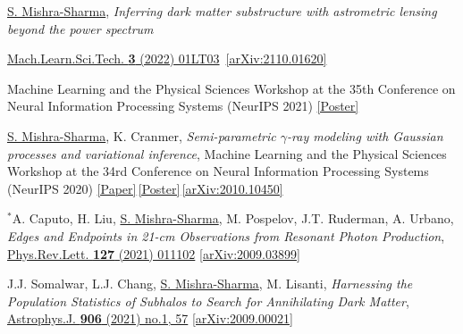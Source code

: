 \documentclass[letterpaper,11pt]{article}
\newenvironment{packed_itemize}{
\begin{itemize}[label=\raisebox{0.25ex}{\tiny$\bullet$}]
  \setlength{\itemsep}{4.2pt}
  \setlength{\parskip}{0pt}
  \setlength{\parsep}{0pt}}{\end{itemize}
}
\newenvironment{packed_enumerate}[1][]{
\begin{etaremune}[#1]
  \setlength{\itemsep}{3.7pt}
  \setlength{\parskip}{0pt}
  \setlength{\parsep}{0pt}}{\end{etaremune}
}
\begin{document}
\begin{packed_enumerate}[start=37]

  \item \underline{S. Mishra-Sharma}, \emph{Inferring dark matter substructure with astrometric lensing beyond the power spectrum}  
  \begin{packed_itemize}
    \item {\href{https://doi.org/10.1088/2632-2153/ac494a}{Mach.Learn.Sci.Tech. \textbf{3} (2022) 01LT03} \,\href{https://arxiv.org/abs/2110.01620}{[arXiv:2110.01620]}}
    \item {{Machine Learning and the Physical Sciences Workshop at the 35th Conference on Neural Information Processing Systems (NeurIPS 2021)} \href{https://ml4physicalsciences.github.io/2021/files/NeurIPS_ML4PS_2021_22_poster.png}{[Poster]}}
    \end{packed_itemize}

  \item\underline{S. Mishra-Sharma}, K. Cranmer, \emph{Semi-parametric $\gamma$-ray modeling with Gaussian processes and variational inference}, {Machine Learning and the Physical Sciences Workshop at the 34rd Conference on Neural Information Processing Systems (NeurIPS 2020)} \href{https://ml4physicalsciences.github.io/2020/files/NeurIPS_ML4PS_2020_20.pdf}{[Paper]}\,\href{https://ml4physicalsciences.github.io/2020/files/NeurIPS_ML4PS_2020_20_poster.pdf}{[Poster]}\,\href{https://arxiv.org/abs/2010.10450}{[arXiv:2010.10450]} 

  \item $^*$A. Caputo, H. Liu, \underline{S. Mishra-Sharma}, M. Pospelov, J.T. Ruderman, A. Urbano, \emph{Edges and Endpoints in 21-cm Observations from Resonant Photon Production},  \href{https://journals.aps.org/prl/abstract/10.1103/PhysRevLett.127.011102}{Phys.Rev.Lett. \textbf{127} (2021) 011102}   \href{https://arxiv.org/abs/2009.03899}{[arXiv:2009.03899]}

  \item J.J. Somalwar, L.J. Chang, \underline{S. Mishra-Sharma}, M. Lisanti, \emph{Harnessing the Population Statistics of Subhalos to Search for Annihilating Dark Matter}, \href{https://iopscience.iop.org/article/10.3847/1538-4357/abc87d}{Astrophys.J. \textbf{906} (2021) no.1, 57} \href{https://arxiv.org/abs/2009.00021}{[arXiv:2009.00021]}


\end{packed_enumerate}
\end{document}
